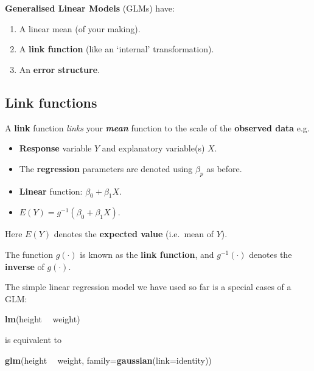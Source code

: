 \documentclass[]{book}
\newenvironment{Shaded}{\begin{snugshade}}{\end{snugshade}}
\newcommand{\KeywordTok}[1]{\textcolor[rgb]{0.13,0.29,0.53}{\textbf{#1}}}
\newcommand{\DataTypeTok}[1]{\textcolor[rgb]{0.13,0.29,0.53}{#1}}
\newcommand{\StringTok}[1]{\textcolor[rgb]{0.31,0.60,0.02}{#1}}
\newcommand{\OperatorTok}[1]{\textcolor[rgb]{0.81,0.36,0.00}{\textbf{#1}}}
\newcommand{\NormalTok}[1]{#1}
\providecommand{\tightlist}{%
  \setlength{\itemsep}{0pt}\setlength{\parskip}{0pt}}
\theoremstyle{definition}
\theoremstyle{definition}
\theoremstyle{definition}
\theoremstyle{remark}
\begin{document}
\textbf{Generalised Linear Models} (GLMs) have:

\begin{enumerate}
\def\labelenumi{\arabic{enumi}.}
\tightlist
\item
  A linear mean (of your making).
\item
  A \textbf{link function} (like an `internal' transformation).
\item
  An \textbf{error structure}.
\end{enumerate}

\subsection{Link functions}\label{link-functions}

A \textbf{link} function \emph{links} your \textbf{\emph{mean}} function
to the scale of the \textbf{observed data} e.g.

\begin{itemize}
\tightlist
\item
  \textbf{Response} variable \(Y\) and explanatory variable(s) \(X\).
\item
  The \textbf{regression} parameters are denoted using \(\beta_p\) as
  before.
\item
  \textbf{Linear} function: \(\beta_0 + \beta_1 X\).
\item
  \(E(Y) = g^{-1}\left(\beta_0 + \beta_1 X\right)\).
\end{itemize}

Here \(E(Y)\) denotes the \textbf{expected value} (i.e.~mean of \(Y\)).

The function \(g(\cdot)\) is known as the \textbf{link function}, and
\(g^{-1}(\cdot)\) denotes the \textbf{inverse} of \(g(\cdot)\).

The simple linear regression model we have used so far is a special
cases of a GLM:

\begin{Shaded}
\begin{Highlighting}[]
\KeywordTok{lm}\NormalTok{(height }\OperatorTok{~}\StringTok{ }\NormalTok{weight)}
\end{Highlighting}
\end{Shaded}

is equivalent to

\begin{Shaded}
\begin{Highlighting}[]
\KeywordTok{glm}\NormalTok{(height }\OperatorTok{~}\StringTok{ }\NormalTok{weight, }\DataTypeTok{family=}\KeywordTok{gaussian}\NormalTok{(}\DataTypeTok{link=}\NormalTok{identity))}
\end{Highlighting}
\end{Shaded}
\end{document}
